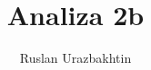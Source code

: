 \documentclass[11pt, a4paper]{article}
\begin{document}
\title{Analiza 2b}
\author{Ruslan Urazbakhtin}
\maketitle

\newpage
\tableofcontents
\newpage



% 

% 
\end{document}

